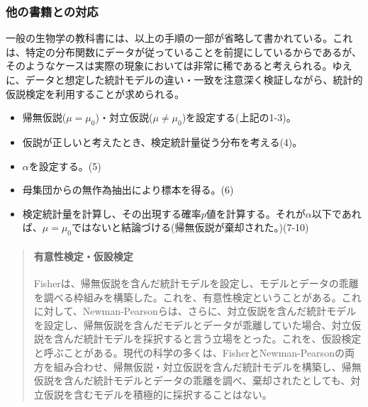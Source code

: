 \subsubsection{他の書籍との対応}
一般の生物学の教科書には、以上の手順の一部が省略して書かれている。これは、特定の分布関数にデータが従っていることを前提にしているからであるが、そのようなケースは実際の現象においては非常に稀であると考えられる。ゆえに、データと想定した統計モデルの違い・一致を注意深く検証しながら、統計的仮説検定を利用することが求められる。
\begin{framed}
    \begin{itemize}
        \item 帰無仮説($\mu = \mu_0$)・対立仮説($\mu\neq \mu_0$)を設定する(上記の1-3)。
        \item 仮説が正しいと考えたとき、検定統計量従う分布を考える(4)。
        \item $\alpha$を設定する。(5)
        \item 母集団からの無作為抽出により標本を得る。(6)
        \item 検定統計量を計算し、その出現する確率$p$値を計算する。それが$\alpha$以下であれば、$\mu=\mu_0$ではないと結論づける(帰無仮説が棄却された。)(7-10)
    \end{itemize}
\end{framed}



\begin{mybox}
    \begin{quotation}
    \paragraph{有意性検定・仮設検定}
    Fisherは、帰無仮説を含んだ統計モデルを設定し、モデルとデータの乖離を調べる枠組みを構築した。これを、有意性検定ということがある。これに対して、Newman-Pearsonらは、さらに、対立仮説を含んだ統計モデルを設定し、帰無仮説を含んだモデルとデータが乖離していた場合、対立仮説を含んだ統計モデルを採択すると言う立場をとった。これを、仮設検定と呼ぶことがある。現代の科学の多くは、FisherとNewman-Pearsonの両方を組み合わせ、帰無仮説・対立仮説を含んだ統計モデルを構築し、帰無仮説を含んだ統計モデルとデータの乖離を調べ、棄却されたとしても、対立仮説を含むモデルを積極的に採択することはない。

    \end{quotation}
\end{mybox}


